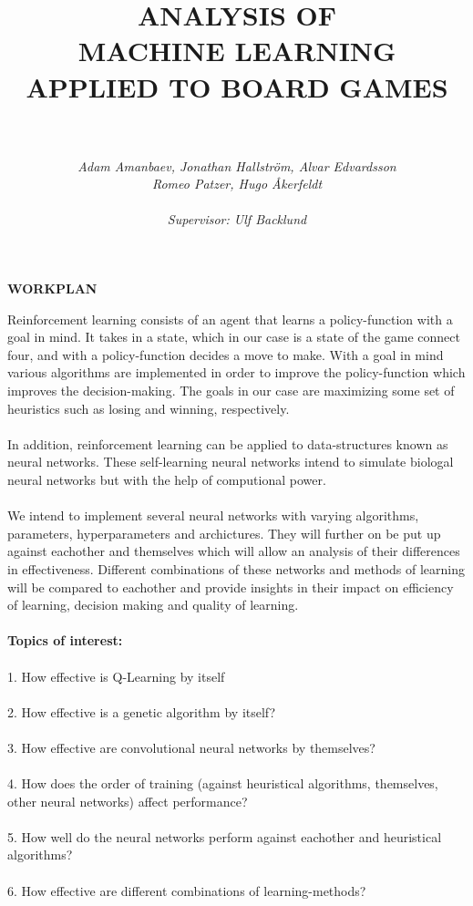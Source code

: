 \documentclass[titlepage]{article}
\title{
    \textbf{ANALYSIS OF \\
    MACHINE LEARNING \\
    APPLIED TO BOARD GAMES}
}
\author{
    \rule{8cm}{0.3mm} \\[0.5in] 
    \textit{Adam Amanbaev, Jonathan Hallström, Alvar Edvardsson} \\
    \textit{Romeo Patzer, Hugo Åkerfeldt} \\\\
    \small \textit{Supervisor: Ulf Backlund}
}
\date{}
\newcommand{\newpara} {
    \vskip 0.4cm
    \noindent
}
\begin{document}
\maketitle

\newpage
\noindent
\textbf{WORKPLAN} 
\newpara
Reinforcement learning consists of an agent that learns a policy-function with a goal in mind.
It takes in a state, which in our case is a state of the game connect four, and with a policy-function decides a move to make.
With a goal in mind various algorithms are implemented in order to improve the policy-function which improves the decision-making.
The goals in our case are maximizing some set of heuristics such as losing and winning, respectively. \\\\
In addition, reinforcement learning can be applied to data-structures known as neural networks.
These self-learning neural networks intend to simulate biologal neural networks but with the help of computional power. \\\\
We intend to implement several neural networks with varying algorithms, parameters, hyperparameters and archictures.
They will further on be put up against eachother and themselves which will allow an analysis of their differences in effectiveness.
Different combinations of these networks and methods of learning will be compared to eachother and provide insights in their impact on efficiency of learning, decision making and quality of learning. \\\\
\textbf{Topics of interest:} \\\\
1. How effective is Q-Learning by itself \\\\
2. How effective is a genetic algorithm by itself? \\\\
3. How effective are convolutional neural networks by themselves? \\\\
4. How does the order of training (against heuristical algorithms, themselves, other neural networks) affect performance? \\\\
5. How well do the neural networks perform against eachother and heuristical algorithms? \\\\
6. How effective are different combinations of learning-methods? \\\\
\end{document}
